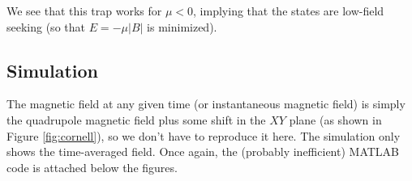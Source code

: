 \documentclass{article}
\theoremstyle{definition}
\begin{document}
We see that this trap works for $\mu < 0$, implying that the states are low-field seeking (so that $E = -\mu |B|$ is minimized). 

\subsection{Simulation}


The magnetic field at any given time (or instantaneous magnetic field) is simply the quadrupole magnetic field plus some shift in the $XY$ plane (as shown in Figure \ref{fig:cornell}), so we don't have to reproduce it here. The simulation only shows the time-averaged field. Once again, the (probably inefficient) MATLAB code is attached below the figures.




\begin{figure}[!htb]
	\centering
	\begin{minipage}{.49\textwidth}
		\centering

\end{minipage}
\end{figure}
\end{document}
